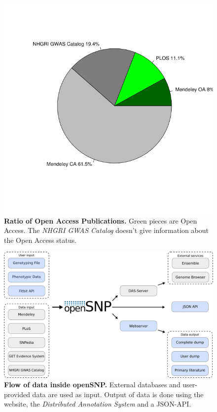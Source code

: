 \documentclass[10pt]{article}
\begin{document}
\begin{figure}[!ht]
	\begin{center}
		\includegraphics[scale=0.6]{25_10_2012_Graphs/new_pie.png}
	\end{center}
	\caption{
	{\bf Ratio of Open Access Publications.} Green pieces are Open Access. The \emph{NHGRI GWAS Catalog} doesn't give information about the Open Access status.}
	\label{oa_label}
\end{figure}

\begin{figure}[!ht]
	\begin{center}
	  \includegraphics[scale=0.3]{latest_uml.png}
	\end{center}
	\caption{
	{\bf Flow of data inside openSNP.} External databases and user-provided data are used as input. Output of data is done using the website, the \emph{Distributed Annotation System} and a JSON-API.} 
	\label{Figure4_label}
\end{figure}
\end{document}
